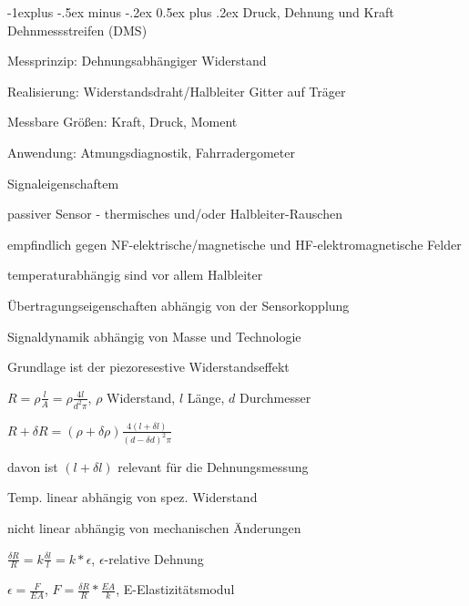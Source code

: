 \documentclass[a4paper]{article}
\makeatletter
\renewcommand{\subsection}{\@startsection{subsection}{2}{0mm}%
 {-1explus -.5ex minus -.2ex}%
 {0.5ex plus .2ex}%
 {\normalfont\normalsize\bfseries}}
\makeatother
\begin{document}
\begin{multicols}{3}
  \subsection{Druck, Dehnung und Kraft}
  Dehnmessstreifen (DMS)
  \begin{itemize*}
    \item Messprinzip: Dehnungsabhängiger Widerstand
    \item Realisierung: Widerstandsdraht/Halbleiter Gitter auf Träger
    \item Messbare Größen: Kraft, Druck, Moment
    \item Anwendung: Atmungsdiagnostik, Fahrradergometer
  \end{itemize*}
  Signaleigenschaftem
  \begin{itemize*}
    \item passiver Sensor - thermisches und/oder Halbleiter-Rauschen
    \item empfindlich gegen NF-elektrische/magnetische und HF-elektromagnetische Felder
    \item temperaturabhängig sind vor allem Halbleiter
    \item Übertragungseigenschaften abhängig von der Sensorkopplung
    \item Signaldynamik abhängig von Masse und Technologie
  \end{itemize*}

  Grundlage ist der piezoresestive Widerstandseffekt
  \begin{itemize*}
    \item $R=\rho\frac{l}{A}=\rho\frac{4l}{d^2\pi}$, $\rho$ Widerstand, $l$ Länge, $d$ Durchmesser
    \item $R+\delta R=(\rho+\delta\rho)\frac{4(l+\delta l)}{(d-\delta d)^2\pi}$
    \item davon ist $(l+\delta l)$ relevant für die Dehnungsmessung
    \item Temp. linear abhängig von spez. Widerstand
    \item nicht linear abhängig von mechanischen Änderungen
  \end{itemize*}
  \begin{itemize*}
    \item $\frac{\delta R}{R}=k\frac{\delta l}{l}=k*\epsilon$, $\epsilon$-relative Dehnung
    \item $\epsilon=\frac{F}{EA}$, $F=\frac{\delta R}{R}*\frac{EA}{k}$, E-Elastizitätsmodul
  \end{itemize*}


\end{multicols}
\end{document}

